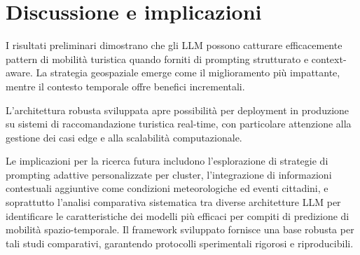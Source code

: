 
\section{Discussione e implicazioni}

I risultati preliminari dimostrano che gli LLM possono catturare efficacemente pattern di mobilità turistica quando forniti di prompting strutturato e context-aware. La strategia geospaziale emerge come il miglioramento più impattante, mentre il contesto temporale offre benefici incrementali.

L'architettura robusta sviluppata apre possibilità per deployment in produzione su sistemi di raccomandazione turistica real-time, con particolare attenzione alla gestione dei casi edge e alla scalabilità computazionale.

Le implicazioni per la ricerca futura includono l'esplorazione di strategie di prompting adattive personalizzate per cluster, l'integrazione di informazioni contestuali aggiuntive come condizioni meteorologiche ed eventi cittadini, e soprattutto l'analisi comparativa sistematica tra diverse architetture LLM per identificare le caratteristiche dei modelli più efficaci per compiti di predizione di mobilità spazio-temporale. Il framework sviluppato fornisce una base robusta per tali studi comparativi, garantendo protocolli sperimentali rigorosi e riproducibili.
